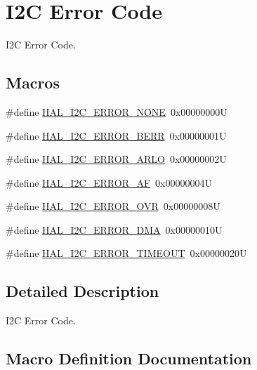 \hypertarget{group___i2_c___error___code}{}\section{I2C Error Code}
\label{group___i2_c___error___code}


I2C Error Code.  


\subsection*{Macros}
\begin{DoxyCompactItemize}
\item 
\#define \mbox{\hyperlink{group___i2_c___error___code_ga0b8ca289091d942032c89484b6211d0d}{H\+A\+L\+\_\+\+I2\+C\+\_\+\+E\+R\+R\+O\+R\+\_\+\+N\+O\+NE}}~0x00000000U
\item 
\#define \mbox{\hyperlink{group___i2_c___error___code_gab9f6e39431ee764ada50fd63f0ad2fbf}{H\+A\+L\+\_\+\+I2\+C\+\_\+\+E\+R\+R\+O\+R\+\_\+\+B\+E\+RR}}~0x00000001U
\item 
\#define \mbox{\hyperlink{group___i2_c___error___code_ga048b36222884bfe80ce2d37fa868690b}{H\+A\+L\+\_\+\+I2\+C\+\_\+\+E\+R\+R\+O\+R\+\_\+\+A\+R\+LO}}~0x00000002U
\item 
\#define \mbox{\hyperlink{group___i2_c___error___code_gad1cc236ad6ba5cafe66aecb0dbedc65a}{H\+A\+L\+\_\+\+I2\+C\+\_\+\+E\+R\+R\+O\+R\+\_\+\+AF}}~0x00000004U
\item 
\#define \mbox{\hyperlink{group___i2_c___error___code_ga38d8f9beb4c681eba786f6154d4f594a}{H\+A\+L\+\_\+\+I2\+C\+\_\+\+E\+R\+R\+O\+R\+\_\+\+O\+VR}}~0x00000008U
\item 
\#define \mbox{\hyperlink{group___i2_c___error___code_gae1091e9e82dcfcfef247b214a11c9db3}{H\+A\+L\+\_\+\+I2\+C\+\_\+\+E\+R\+R\+O\+R\+\_\+\+D\+MA}}~0x00000010U
\item 
\#define \mbox{\hyperlink{group___i2_c___error___code_gaeb3bedf36d78ddf3284a68494ab9d089}{H\+A\+L\+\_\+\+I2\+C\+\_\+\+E\+R\+R\+O\+R\+\_\+\+T\+I\+M\+E\+O\+UT}}~0x00000020U
\end{DoxyCompactItemize}


\subsection{Detailed Description}
I2C Error Code. 



\subsection{Macro Definition Documentation}
\mbox{\label{group___i2_c___error___code_gad1cc236ad6ba5cafe66aecb0dbedc65a}} 

